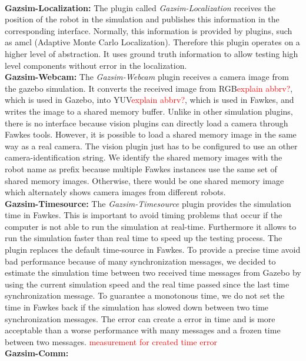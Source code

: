 \\
\textbf{Gazsim-Localization:}
The plugin called \textit{Gazsim-Localization} receives the position of the robot in the simulation and publishes this information in the corresponding interface. Normally, this information is provided by plugins, such as amcl (Adaptive Monte Carlo Localization). Therefore this plugin operates on a higher level of abstraction. It uses ground truth information to allow testing high level components without error in the localization. 
\\
\textbf{Gazsim-Webcam:}
The \textit{Gazsim-Webcam} plugin receives a camera image from the gazebo simulation. It converts the received image from RGB\textcolor{red}{explain abbrv?}, which is used in Gazebo, into YUV\textcolor{red}{explain abbrv?}, which is used in Fawkes, and writes the image to a shared memory buffer. Unlike in other simulation plugins, there is no interface because vision plugins can directly load a camera through Fawkes tools. However, it is possible to load a shared memory image in the same way as a real camera. The vision plugin just has to be configured to use an other camera-identification string. We identify the shared memory images with the robot name as prefix because multiple Fawkes instances use the same set of shared memory images. Otherwise, there would be one shared memory image which alternately shows camera images from different robots.
\\
\textbf{Gazsim-Timesource:}
The \textit{Gazsim-Timesource} plugin provides the simulation time in Fawkes. This is important to avoid timing problems that occur if the computer is not able to run the simulation at real-time. Furthermore it allows to run the simulation faster than real time to speed up the testing process. The plugin replaces the default time-source in Fawkes. To provide a precise time avoid bad performance because of many synchronization messages, we decided to estimate the simulation time between two received time messages from Gazebo by using the current simulation speed and the real time passed since the last time synchronization message. To guarantee a monotonous time, we do not set the time in Fawkes back if the simulation has slowed down between two time synchronization messages. The error can create a error in time and is more acceptable than a worse performance with many  messages and a frozen time between two messages.
\textcolor{red}{measurement for created time error}\\
\textbf{Gazsim-Comm:}
